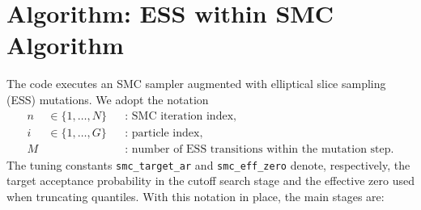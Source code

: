 \documentclass[11pt]{article}
\begin{document}
\section{Algorithm: ESS within SMC Algorithm}
The code executes an SMC sampler augmented with elliptical slice sampling (ESS) mutations. We adopt the notation
\begin{align*}
n &\in \{1,\ldots,N\} &&\text{: SMC iteration index},\\
i &\in \{1,\ldots,G\} &&\text{: particle index},\\
M & &&\text{: number of ESS transitions within the mutation step}.
\end{align*}
The tuning constants \texttt{smc\_target\_ar} and \texttt{smc\_eff\_zero} denote, respectively, the target acceptance probability in the cutoff search stage and the effective zero used when truncating quantiles. With this notation in place, the main stages are:
\end{document}
